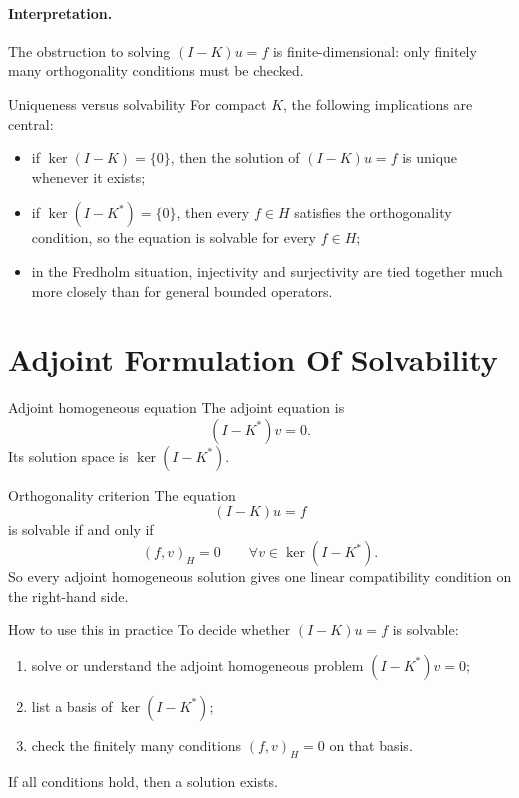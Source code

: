 \documentclass[header={Lecture 9 Exam Study Notes}]{study-note}
\begin{document}
\paragraph{Interpretation.}
The obstruction to solving $(I-K)u=f$ is finite-dimensional: only finitely many orthogonality conditions must be checked.

\begin{thmbox}{Uniqueness versus solvability}
For compact $K$, the following implications are central:
\begin{itemize}
\item if $\ker(I-K)=\{0\}$, then the solution of $(I-K)u=f$ is unique whenever it exists;
\item if $\ker(I-K^*)=\{0\}$, then every $f\in H$ satisfies the orthogonality condition, so the equation is solvable for every $f\in H$;
\item in the Fredholm situation, injectivity and surjectivity are tied together much more closely than for general bounded operators.
\end{itemize}
\end{thmbox}

\section{Adjoint Formulation Of Solvability}

\begin{defbox}{Adjoint homogeneous equation}
The adjoint equation is
\[
(I-K^*)v=0.
\]
Its solution space is $\ker(I-K^*)$.
\end{defbox}

\begin{thmbox}{Orthogonality criterion}
The equation
\[
(I-K)u=f
\]
is solvable if and only if
\[
(f,v)_H=0 \qquad \forall v\in \ker(I-K^*).
\]
So every adjoint homogeneous solution gives one linear compatibility condition on the right-hand side.
\end{thmbox}

\begin{exbox}{How to use this in practice}
To decide whether $(I-K)u=f$ is solvable:
\begin{enumerate}
\item solve or understand the adjoint homogeneous problem $(I-K^*)v=0$;
\item list a basis of $\ker(I-K^*)$;
\item check the finitely many conditions $(f,v)_H=0$ on that basis.
\end{enumerate}
If all conditions hold, then a solution exists.
\end{exbox}
\end{document}
